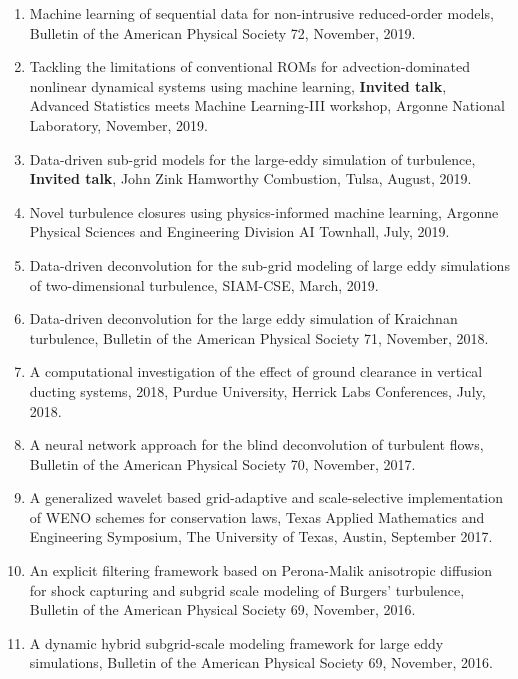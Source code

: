 \documentclass[letterpaper]{article}
\begin{document}
\begin{enumerate}
\item Machine learning of sequential data for non-intrusive reduced-order models, Bulletin of the American Physical Society 72, November, 2019.

\item Tackling the limitations of conventional ROMs for advection-dominated nonlinear dynamical systems using machine learning, \textbf{Invited talk}, Advanced Statistics meets Machine Learning-III workshop, Argonne National Laboratory, November, 2019.

\item Data-driven sub-grid models for the large-eddy simulation of turbulence, \textbf{Invited talk}, John Zink Hamworthy Combustion, Tulsa, August, 2019.

\item Novel turbulence closures using physics-informed machine learning, Argonne Physical Sciences and Engineering Division AI Townhall, July, 2019. 

\item Data-driven deconvolution for the sub-grid modeling of large eddy simulations of two-dimensional turbulence, SIAM-CSE, March, 2019.

\item Data-driven deconvolution for the large eddy simulation of Kraichnan turbulence, Bulletin of the American Physical Society 71, November, 2018.

\item A computational investigation of the effect of ground clearance in vertical ducting systems, 2018, Purdue University, Herrick Labs Conferences, July, 2018. 

\item A neural network approach for the blind deconvolution of turbulent flows, Bulletin of the American Physical Society 70, November, 2017.

\item A generalized wavelet based grid-adaptive and scale-selective implementation of WENO schemes for conservation laws, Texas Applied Mathematics and Engineering Symposium, The University of Texas, Austin, September 2017.

\item An explicit filtering framework based on Perona-Malik anisotropic diffusion for shock capturing and subgrid scale modeling of Burgers' turbulence, Bulletin of the American Physical Society 69, November, 2016.

\item A dynamic hybrid subgrid-scale modeling framework for large eddy simulations, Bulletin of the American Physical Society 69, November, 2016.

\end{enumerate}
\end{document}
